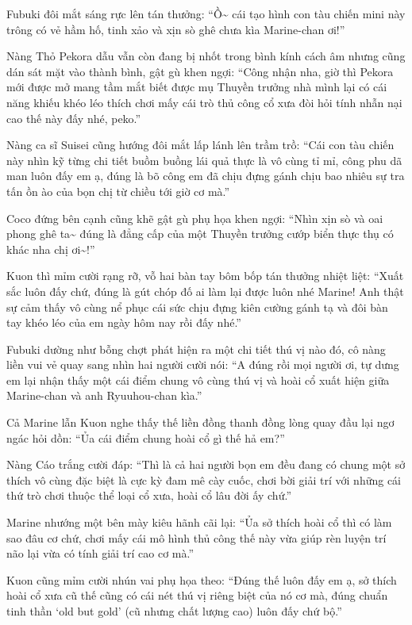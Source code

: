 \documentclass[../main.tex]{subfiles}
\begin{document}
Fubuki đôi mắt sáng rực lên tán thưởng: ``Ồ\~{} cái tạo hình con tàu chiến mini này trông có vẻ hầm hố, tinh xảo và xịn sò ghê chưa kìa Marine-chan ơi!''

Nàng Thỏ Pekora dẫu vẫn còn đang bị nhốt trong bình kính cách âm nhưng cũng dán sát mặt vào thành bình, gật gù khen ngợi: ``Công nhận nha, giờ thì Pekora mới được mở mang tầm mắt biết được mụ Thuyền trưởng nhà mình lại có cái năng khiếu khéo léo thích chơi mấy cái trò thủ công cổ xưa đòi hỏi tính nhẫn nại cao thế này đấy nhé, peko.''

Nàng ca sĩ Suisei cũng hướng đôi mắt lấp lánh lên trầm trồ: ``Cái con tàu chiến này nhìn kỹ từng chi tiết buồm buồng lái quả thực là vô cùng tỉ mỉ, công phu dã man luôn đấy em ạ, đúng là bõ công em đã chịu đựng gánh chịu bao nhiêu sự tra tấn ồn ào của bọn chị từ chiều tới giờ cơ mà.''

Coco đứng bên cạnh cũng khẽ gật gù phụ họa khen ngợi: ``Nhìn xịn sò và oai phong ghê ta\~{} đúng là đẳng cấp của một Thuyền trưởng cướp biển thực thụ có khác nha chị ơi\~{}!''

Kuon thì mỉm cười rạng rỡ, vỗ hai bàn tay bôm bốp tán thưởng nhiệt liệt: ``Xuất sắc luôn đấy chứ, đúng là gút chóp đố ai làm lại được luôn nhé Marine! Anh thật sự cảm thấy vô cùng nể phục cái sức chịu đựng kiên cường gánh tạ và đôi bàn tay khéo léo của em ngày hôm nay rồi đấy nhé.''

Fubuki dường như bỗng chợt phát hiện ra một chi tiết thú vị nào đó, cô nàng liền vui vẻ quay sang nhìn hai người cười nói: ``A đúng rồi mọi người ơi, tự dưng em lại nhận thấy một cái điểm chung vô cùng thú vị và hoài cổ xuất hiện giữa Marine-chan và anh Ryuuhou-chan kìa.''

Cả Marine lẫn Kuon nghe thấy thế liền đồng thanh đồng lòng quay đầu lại ngơ ngác hỏi dồn: ``Ủa cái điểm chung hoài cổ gì thế hả em?''

Nàng Cáo trắng cười đáp: ``Thì là cả hai người bọn em đều đang có chung một sở thích vô cùng đặc biệt là cực kỳ đam mê cày cuốc, chơi bời giải trí với những cái thứ trò chơi thuộc thể loại cổ xưa, hoài cổ lâu đời ấy chứ.''

Marine nhướng một bên mày kiêu hãnh cãi lại: ``Ủa sở thích hoài cổ thì có làm sao đâu cơ chứ, chơi mấy cái mô hình thủ công thế này vừa giúp rèn luyện trí não lại vừa có tính giải trí cao cơ mà.''

Kuon cũng mỉm cười nhún vai phụ họa theo: ``Đúng thế luôn đấy em ạ, sở thích hoài cổ xưa cũ thế cũng có cái nét thú vị riêng biệt của nó cơ mà, đúng chuẩn tinh thần `old but gold' (cũ nhưng chất lượng cao) luôn đấy chứ bộ.''
\end{document}
